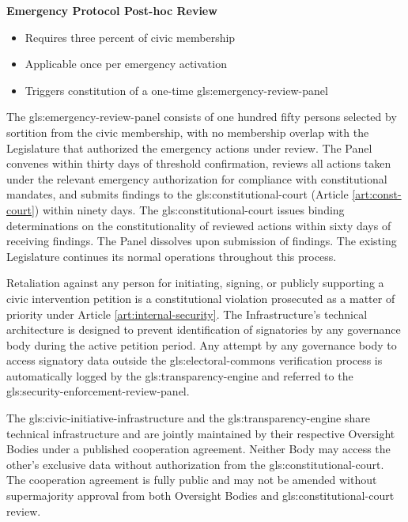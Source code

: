 \textbf{Emergency Protocol Post-hoc Review}
\begin{itemize}
  \item Requires three percent of civic membership
  \item Applicable once per emergency activation
  \item Triggers constitution of a one-time \gls{gls:emergency-review-panel}
\end{itemize}

The \gls{gls:emergency-review-panel} consists of one hundred fifty persons selected by sortition from the civic membership, with no membership overlap with the Legislature that authorized the emergency actions under review. The Panel convenes within thirty days of threshold confirmation, reviews all actions taken under the relevant emergency authorization for compliance with constitutional mandates, and submits findings to the \gls{gls:constitutional-court} (Article \ref{art:const-court}) within ninety days. The \gls{gls:constitutional-court} issues binding determinations on the constitutionality of reviewed actions within sixty days of receiving findings. The Panel dissolves upon submission of findings. The existing Legislature continues its normal operations throughout this process.

Retaliation against any person for initiating, signing, or publicly supporting a civic intervention petition is a constitutional violation prosecuted as a matter of priority under Article \ref{art:internal-security}. The Infrastructure's technical architecture is designed to prevent identification of signatories by any governance body during the active petition period. Any attempt by any governance body to access signatory data outside the \gls{gls:electoral-commons} verification process is automatically logged by the \gls{gls:transparency-engine} and referred to the \gls{gls:security-enforcement-review-panel}.

The \gls{gls:civic-initiative-infrastructure} and the \gls{gls:transparency-engine} share technical infrastructure and are jointly maintained by their respective Oversight Bodies under a published cooperation agreement. Neither Body may access the other's exclusive data without authorization from the \gls{gls:constitutional-court}. The cooperation agreement is fully public and may not be amended without supermajority approval from both Oversight Bodies and \gls{gls:constitutional-court} review.